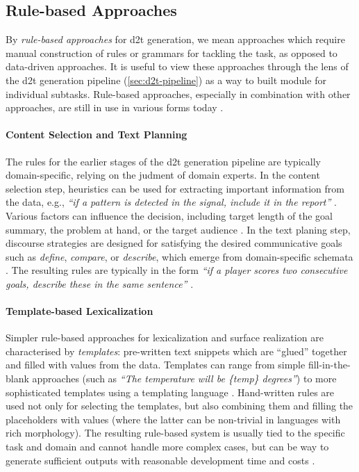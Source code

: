 \subsection{Rule-based Approaches}
\label{sec:rule-d2t}

By \emph{rule-based approaches} for \ac{d2t} generation, we mean approaches which require manual construction of rules or grammars for tackling the task, as opposed to data-driven approaches. It is useful to view these approaches through the lens of the \ac{d2t} generation pipeline (\autoref{sec:d2t-pipeline}) as a way to built module for individual subtasks. Rule-based approaches, especially in combination with other approaches, are still in use in various forms today \cite{gattSurveyStateArt2018,daleNaturalLanguageGeneration2020,daleNavigatingTextGeneration2023}.


\paragraph{Content Selection and Text Planning} The rules for the earlier stages of the \ac{d2t} generation pipeline are typically domain-specific, relying on the judment of domain experts. In the content selection step, heuristics can be used for extracting important information from the data, e.g., \textit{``if a pattern is detected in the signal, include it in the report''} \cite{portet2009automatic}. Various factors can influence the decision, including target length of the goal summary, the problem at hand, or the target audience \cite{gkatzia2016content}. In the text planing step, discourse strategies are designed for satisfying the desired communicative goals such as \emph{define}, \emph{compare}, or \emph{describe}, which emerge from domain-specific schemata \cite{mckeown1985text}. The resulting rules are typically in the form \textit{``if a player scores two consecutive goals, describe these in the same sentence''}  \cite{gattSurveyStateArt2018}.


\paragraph{Template-based Lexicalization} Simpler rule-based approaches for lexicalization and surface realization are characterised by \emph{templates}: pre-written text snippets which are ``glued'' together and filled with values from the data. Templates can range from simple fill-in-the-blank approaches (such as \textit{``The temperature will be \{temp\} degrees''}) to more sophisticated templates using a templating language \cite{reiter2016nlg,gatt2009simplenlg}.  Hand-written rules are used not only for selecting the templates, but also combining them and filling the placeholders with values (where the latter can be non-trivial in languages with rich morphology). The resulting rule-based system is usually tied to the specific task and domain and cannot handle more complex cases, but can be way to generate sufficient outputs with reasonable development time and costs \cite{vanderleeAutomatedLearningTemplates2018}.


